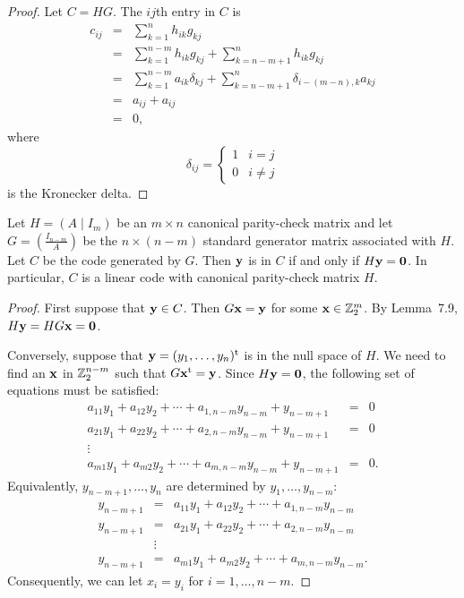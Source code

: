  
\begin{proof}
Let $C = HG$.  The $ij$th entry in $C$ is
\begin{eqnarray*}
c_{ij}
& = &
\sum_{k=1}^n h_{ik} g_{kj} \\
& = &
\sum_{k=1}^{n-m} h_{ik} g_{kj}
+ \sum_{k=n-m+1}^n h_{ik} g_{kj} \\
& = &
\sum_{k=1}^{n-m} a_{ik} \delta_{kj}
+ \sum_{k=n-m+1}^n \delta_{i-(m-n),k} a_{kj} \\
& = &
a_{ij} + a_{ij} \\
& = &
0,
\end{eqnarray*}
where
\[
\delta_{ij}\label{notekron}
=
\left\{
\begin{array}{cc}
1 & i = j \\
0 & i \neq j
\end{array}
\right.
\]
is the Kronecker delta.
\end{proof}
 
 
\begin{theorem}
Let $H = (A \mid I_m )$ be an $m \times n$ canonical parity-check
matrix and let $G = \left( \frac{I_{n-m} }{A} \right) $ be the $n
\times (n-m)$ standard generator matrix associated with $H$. Let $C$
be the code generated by $G$. Then ${\bold y}$ is in $C$ if and only
if $H {\bold y} = {\bold 0}$. In particular, $C$ is a linear code with
canonical parity-check matrix $H$. 
\end{theorem}
 
 
\begin{proof}
First suppose that ${\bold y} \in C$. Then $G {\bold x} = {\bold y}$
for some ${\bold x} \in {\Bbb Z}_2^m$. By Lemma~7.9, $H {\bold y} = HG
{\bold x} = {\bold 0}$. 
 
 
Conversely, suppose that ${\bold y} = (y_1, \ldots, y_n)^{\rm t}$ is
in the null space of $H$.  We need to find an ${\bold x}$ in ${\Bbb
Z}_2^{n-m}$ such that $G {\bold x}^{\rm t} = {\bold y}$. Since $H
{\bold y} = {\bold 0}$, the following set of equations must be
satisfied:  
\begin{eqnarray*}
a_{11} y_1 + a_{12} y_2 + \cdots + a_{1, n-m} y_{n-m} +
y_{n-m+1}
& = & 0 \\
a_{21} y_1 + a_{22} y_2 + \cdots + a_{2, n-m} y_{n-m} +
y_{n-m+1}
& = & 0 \\
\vdots  &  & \\
a_{m1} y_1 + a_{m2} y_2 + \cdots + a_{m, n-m} y_{n-m} +
y_{n-m+1}
& = & 0.
\end{eqnarray*}
Equivalently, $y_{n-m+1}, \ldots, y_n$ are determined by $y_1, \ldots,
y_{n-m}$: 
\begin{eqnarray*}
y_{n-m+1}
& = &
a_{11} y_1 + a_{12} y_2 + \cdots + a_{1, n-m} y_{n-m} \\
y_{n-m+1}
& = &
a_{21} y_1 + a_{22} y_2 + \cdots + a_{2, n-m} y_{n-m} \\
& \vdots & \\
y_{n-m+1}
& = &
a_{m1} y_1 + a_{m2} y_2 + \cdots + a_{m, n-m} y_{n-m}.
\end{eqnarray*}
Consequently, we can let $x_i = y_i$ for $i= 1, \ldots, n - m$.
\end{proof}
 
